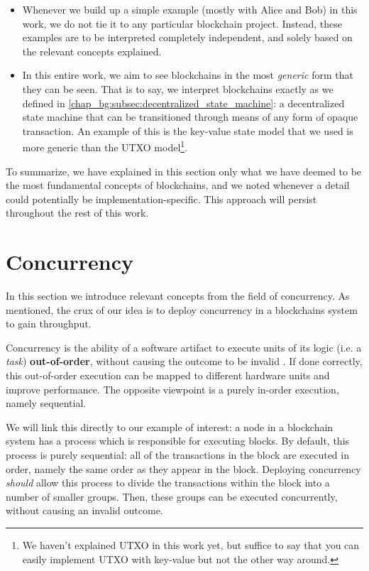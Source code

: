 \begin{itemize}
	\item Whenever we build up a simple example (mostly with Alice and Bob) in this work, we do not
	tie it to any particular blockchain project. Instead, these examples are to be interpreted
	completely independent, and solely based on the relevant concepts explained.
	\item In this entire work, we aim to see blockchains in the most \textit{generic} form that they
	can be seen. That is to say, we interpret blockchains exactly as we defined in
	\ref{chap_bg:subsec:decentralized_state_machine}: a decentralized state machine that can be
	transitioned through means of any form of opaque transaction. An example of this is the
	key-value state model that we used is more generic than the UTXO model\footnote{We haven't
	explained UTXO in this work yet, but suffice to say that you can easily implement UTXO with
	key-value but not the other way around.}.
	\end{itemize}

To summarize, we have explained in this section only what we have deemed to be the most fundamental
concepts of blockchains, and we noted whenever a detail could potentially be
implementation-specific. This approach will persist throughout the rest of this work.

\section{Concurrency} \label{chap_bg:sec:concurrency}

In this section we introduce relevant concepts from the field of concurrency. As mentioned, the crux
of our idea is to deploy concurrency in a blockchains system to gain throughput.

Concurrency is the ability of a software artifact to execute units of its logic (i.e. a
\textit{task}) \textbf{out-of-order}, without causing the outcome to be invalid
\cite{lamportTimeClocksOrdering1978}. If done correctly, this out-of-order execution can be mapped
to different hardware units and improve performance. The opposite viewpoint is a purely in-order
execution, namely sequential.

We will link this directly to our example of interest: a node in a blockchain system has a process
which is responsible for executing blocks. By default, this process is purely sequential: all of the
transactions in the block are executed in order, namely the same order as they appear in the block.
Deploying concurrency \textit{should} allow this process to divide the transactions within the block
into a number of smaller groups. Then, these groups can be executed concurrently, without causing an
invalid outcome.

